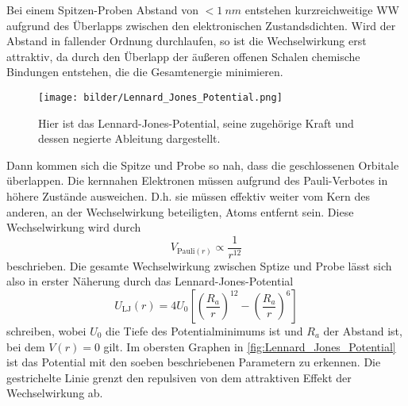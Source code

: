     Bei einem Spitzen-Proben Abstand von $< \SI{1}{nm}$ entstehen kurzreichweitige WW aufgrund des Überlapps zwischen den elektronischen Zustandsdichten.
    Wird der Abstand in fallender Ordnung durchlaufen, so ist die Wechselwirkung erst attraktiv, da durch den Überlapp der äußeren offenen Schalen chemische Bindungen entstehen, die die Gesamtenergie minimieren. \\
    \setlength{\columnsep}{10pt}
    \begin{wrapfigure}{r}{0.4\textwidth}
        \centering{}
        \texttt{[image: bilder/Lennard\_Jones\_Potential.png]}
        \caption{Hier ist das Lennard-Jones-Potential, seine zugehörige Kraft und dessen negierte Ableitung dargestellt. \cite{voigtlaender}} \vspace*{-0.5cm}
        \label{fig:Lennard_Jones_Potential}
    \end{wrapfigure}
    Dann kommen sich die Spitze und Probe so nah, dass die geschlossenen Orbitale überlappen.
    Die kernnahen Elektronen müssen aufgrund des Pauli-Verbotes in höhere Zustände ausweichen.
    D.h. sie müssen effektiv weiter vom Kern des anderen, an der Wechselwirkung beteiligten, Atoms entfernt sein.
    Diese Wechselwirkung wird durch
    \begin{equation}
        V_{\mathrm{Pauli}(r)} \propto \frac{1}{r^{12}}
    \end{equation}
    beschrieben.
    Die gesamte Wechselwirkung zwischen Sptize und Probe lässt sich also in erster Näherung durch das Lennard-Jones-Potential
    \begin{equation}
        U_{\mathrm{LJ}}(r) = 4 U_0 \left[\left(\frac{R_a}{r}\right)^{12} - \left(\frac{R_a}{r}\right)^6\right]
        \label{eqn:Lennard_Jones_Potential}
    \end{equation}
    schreiben, wobei $U_0$ die Tiefe des Potentialminimums ist und $R_a$ der Abstand ist, bei dem $V(r) = 0$ gilt.
    Im obersten Graphen in \autoref{fig:Lennard_Jones_Potential} ist das Potential mit den soeben beschriebenen Parametern zu erkennen.
    Die gestrichelte Linie grenzt den repulsiven von dem attraktiven Effekt der Wechselwirkung ab.

